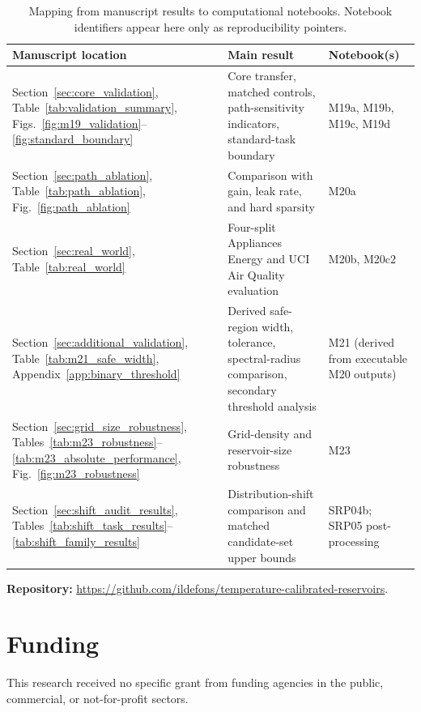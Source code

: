 \documentclass[preprint,12pt,authoryear]{elsarticle}
\begin{document}
\begin{table}[H]
\centering
\caption{Mapping from manuscript results to computational notebooks. Notebook identifiers appear here only as reproducibility pointers.}
\label{tab:repro_map}
\footnotesize
\begin{tabularx}{\textwidth}{>{\raggedright\arraybackslash}p{}>{\raggedright\arraybackslash}p{}>{\raggedright\arraybackslash}X}
\toprule
Manuscript location & Main result & Notebook(s) \\
\midrule
Section~\ref{sec:core_validation}, Table~\ref{tab:validation_summary}, Figs.~\ref{fig:m19_validation}--\ref{fig:standard_boundary} & Core transfer, matched controls, path-sensitivity indicators, standard-task boundary & M19a, M19b, M19c, M19d \\
Section~\ref{sec:path_ablation}, Table~\ref{tab:path_ablation}, Fig.~\ref{fig:path_ablation} & Comparison with gain, leak rate, and hard sparsity & M20a \\
Section~\ref{sec:real_world}, Table~\ref{tab:real_world} & Four-split Appliances Energy and UCI Air Quality evaluation & M20b, M20c2 \\
Section~\ref{sec:additional_validation}, Table~\ref{tab:m21_safe_width}, Appendix~\ref{app:binary_threshold} & Derived safe-region width, tolerance, spectral-radius comparison, secondary threshold analysis & M21 (derived from executable M20 outputs) \\
Section~\ref{sec:grid_size_robustness}, Tables~\ref{tab:m23_robustness}--\ref{tab:m23_absolute_performance}, Fig.~\ref{fig:m23_robustness} & Grid-density and reservoir-size robustness & M23 \\
Section~\ref{sec:shift_audit_results}, Tables~\ref{tab:shift_task_results}--\ref{tab:shift_family_results} & Distribution-shift comparison and matched candidate-set upper bounds & SRP04b; SRP05 post-processing \\
\bottomrule
\end{tabularx}
\end{table}

\noindent\textbf{Repository:} \url{https://github.com/ildefons/temperature-calibrated-reservoirs}.


\section*{Funding}

This research received no specific grant from funding agencies in the public, commercial, or not-for-profit sectors.
\end{document}
